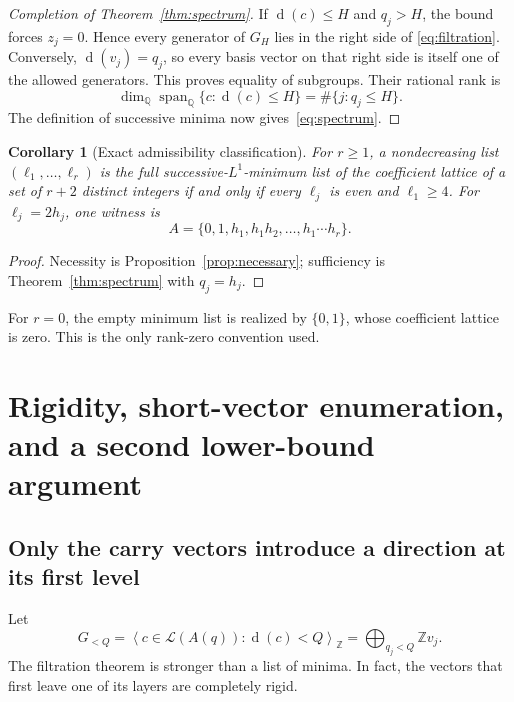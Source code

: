 \documentclass[11pt]{article}
\numberwithin{equation}{section}
\newtheorem{corollary}[theorem]{Corollary}
\theoremstyle{definition}
\theoremstyle{remark}\newtheorem{remark}[theorem]{Remark}
\newcommand{\Z}{\mathbb Z}\newcommand{\N}{\mathbb N}
\newcommand{\Q}{\mathbb Q}\newcommand{\R}{\mathbb R}
\newcommand{\Latt}{\mathcal L}
\newcommand{\dgr}{\operatorname{d}}
\newcommand{\Span}{\operatorname{span}}
\begin{document}
\begin{proof}[Completion of Theorem~\ref{thm:spectrum}]
If $\dgr(c)\le H$ and $q_j>H$, the bound forces $z_j=0$.
Hence every generator of $G_H$ lies in the right side of
\eqref{eq:filtration}.  Conversely, $\dgr(v_j)=q_j$, so every basis
vector on that right side is itself one of the allowed generators.
This proves equality of subgroups.  Their rational rank is
\begin{equation}\label{eq:rankprofile}
 \dim_\Q\Span_\Q\{c:\dgr(c)\le H\}=\#\{j:q_j\le H\}.
\end{equation}
The definition of successive minima now gives~\eqref{eq:spectrum}.
\end{proof}

\begin{corollary}[Exact admissibility classification]\label{cor:realization}
For $r\ge1$, a nondecreasing list $(\ell_1,\ldots,\ell_r)$ is the full
successive-$L^1$-minimum list of the coefficient lattice of a set of
$r+2$ distinct integers if and only if every $\ell_j$ is even and
$\ell_1\ge4$.  For $\ell_j=2h_j$, one witness is
\[
 \boxed{\ A=\{0,1,h_1,h_1h_2,\ldots,h_1\cdots h_r\}.\ }
\]
\end{corollary}
\begin{proof}
Necessity is Proposition~\ref{prop:necessary}; sufficiency is
Theorem~\ref{thm:spectrum} with $q_j=h_j$.
\end{proof}
For $r=0$, the empty minimum list is realized by $\{0,1\}$, whose
coefficient lattice is zero.  This is the only rank-zero convention used.

\section{Rigidity, short-vector enumeration, and a second lower-bound argument}

\subsection{Only the carry vectors introduce a direction at its first level}

Let
\[
 G_{<Q}=\left\langle c\in\Latt(A(q)):\dgr(c)<Q\right\rangle_\Z
       =\bigoplus_{q_j<Q}\Z v_j.
\]
The filtration theorem is stronger than a list of minima.  In fact, the
vectors that first leave one of its layers are completely rigid.
\end{document}
